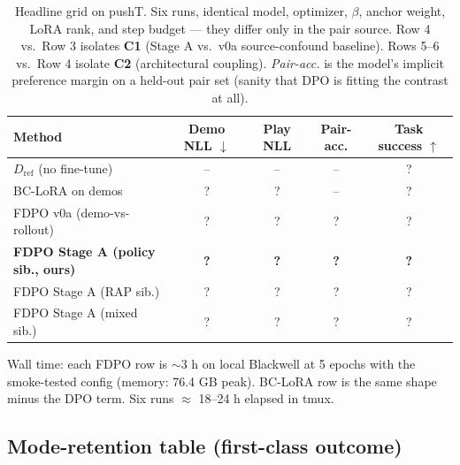 \documentclass[11pt]{article}
\newcommand{\Dref}{D_{\mathrm{ref}}}
\begin{document}
\begin{table}[h]
    \centering
    \small
    \begin{tabular}{lcccc}
        \hline
        \textbf{Method} & \textbf{Demo NLL $\downarrow$} & \textbf{Play NLL} & \textbf{Pair-acc.} & \textbf{Task success $\uparrow$} \\
        \hline
        $\Dref$ (no fine-tune)                  & --   & --   & --   & ?    \\
        BC-LoRA on demos                        & ?    & ?    & --   & ?    \\
        FDPO v0a (demo-vs-rollout)              & ?    & ?    & ?    & ?    \\
        \textbf{FDPO Stage A (policy sib., ours)} & \textbf{?} & \textbf{?} & \textbf{?} & \textbf{?} \\
        FDPO Stage A (RAP sib.)                 & ?    & ?    & ?    & ?    \\
        FDPO Stage A (mixed sib.)               & ?    & ?    & ?    & ?    \\
        \hline
    \end{tabular}
    \caption{Headline grid on pushT. Six runs, identical model, optimizer, $\beta$, anchor weight, LoRA rank, and step budget --- they differ only in the pair source. Row 4 vs.\ Row 3 isolates \textbf{C1} (Stage A vs.\ v0a source-confound baseline). Rows 5--6 vs.\ Row 4 isolate \textbf{C2} (architectural coupling). \emph{Pair-acc.} is the model's implicit preference margin on a held-out pair set (sanity that DPO is fitting the contrast at all).}
    \label{tab:headline}
\end{table}

Wall time: each FDPO row is $\sim 3$ h on local Blackwell at 5 epochs with the smoke-tested config (memory: 76.4 GB peak). BC-LoRA row is the same shape minus the DPO term. Six runs $\approx$ 18--24 h elapsed in tmux.

\subsection{Mode-retention table (first-class outcome)}
\label{sec:retention}
\end{document}
